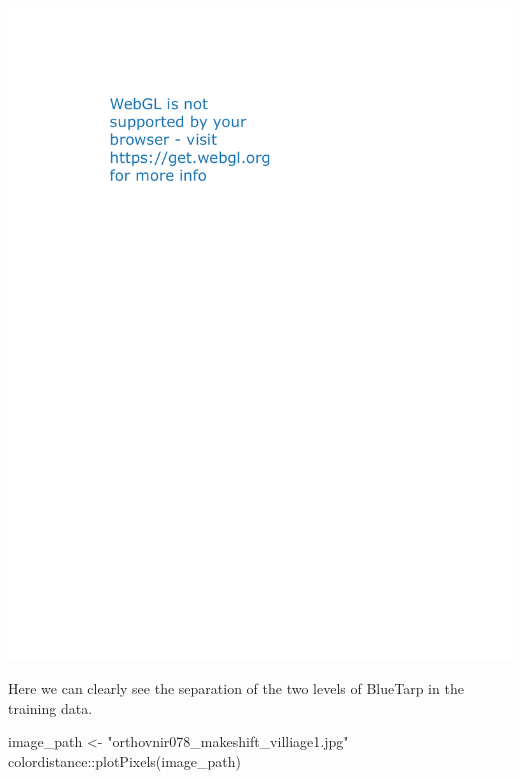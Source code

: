 \documentclass[
]{article}
\newenvironment{Shaded}{\begin{snugshade}}{\end{snugshade}}
\newcommand{\FunctionTok}[1]{\textcolor[rgb]{0.00,0.00,0.00}{#1}}
\newcommand{\NormalTok}[1]{#1}
\newcommand{\OtherTok}[1]{\textcolor[rgb]{0.56,0.35,0.01}{#1}}
\newcommand{\SpecialCharTok}[1]{\textcolor[rgb]{0.00,0.00,0.00}{#1}}
\newcommand{\StringTok}[1]{\textcolor[rgb]{0.31,0.60,0.02}{#1}}
\begin{document}
\begin{center}\includegraphics{ProjectPart1_MERGED_files/figure-latex/plotly plot-1} \end{center}

Here we can clearly see the separation of the two levels of BlueTarp in
the training data.

\begin{Shaded}
\begin{Highlighting}[]
\NormalTok{image\_path }\OtherTok{\textless{}{-}} \StringTok{"orthovnir078\_makeshift\_villiage1.jpg"}
\NormalTok{colordistance}\SpecialCharTok{::}\FunctionTok{plotPixels}\NormalTok{(image\_path)}
\end{Highlighting}
\end{Shaded}
\end{document}

